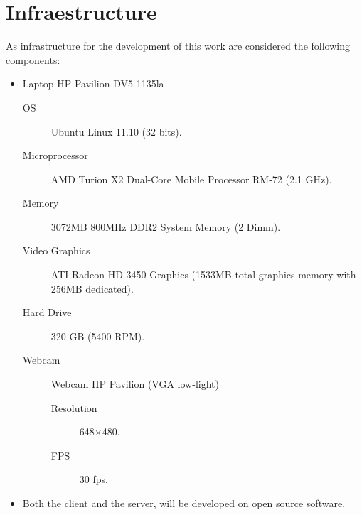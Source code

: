 \documentclass[12pt,letterpaper,titlepage]{article}
\begin{document}


\clearpage
\section{Infraestructure}
As infrastructure for the development of this work are considered the following components:
\begin{itemize}
\item Laptop HP Pavilion DV5-1135la
	\begin{description}
	\item[OS] Ubuntu Linux 11.10 (32 bits).
	\item[Microprocessor] AMD Turion X2 Dual-Core Mobile Processor RM-72 (2.1 GHz).
	\item[Memory] 3072MB 800MHz DDR2 System Memory (2 Dimm).
	\item[Video Graphics] ATI Radeon HD 3450 Graphics (1533MB total graphics memory with 256MB dedicated).
	\item[Hard Drive] 320 GB (5400 RPM).
	\item[Webcam] Webcam HP Pavilion (VGA low-light)
		\begin{description}
		\item[Resolution] 648$\times$480.
		\item[FPS] 30 fps.
		\end{description}
	\end{description}
\item Both the client and the server, will be developed on open source software.
\end{itemize}
\clearpage
%


\end{document}
